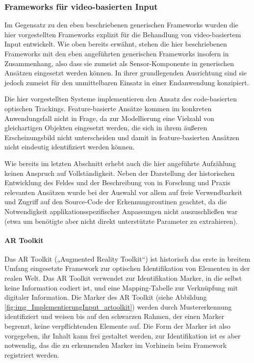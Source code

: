 
\subsubsection{Frameworks für video-basierten Input} %
\label{ssub:frameworks_für_video_basierten_input}

Im Gegensatz zu den eben beschriebenen generischen Frameworks wurden die hier vorgestellten Frameworks explizit für die Behandlung von video-basiertem Input entwickelt. Wie oben bereits erwähnt, stehen die hier beschriebenen Frameworks mit den eben angeführten generischen Frameworks insofern in Zusammenhang, also dass sie zumeist als Sensor-Komponente in generischen Ansätzen eingesetzt werden können. In ihrer grundlegenden Ausrichtung sind sie jedoch zumeist für den unmittelbaren Einsatz in einer Endanwendung konzipiert.

Die hier vorgestellten Systeme implementieren den Ansatz des code-basierten optischen Trackings. Feature-basierte Ansätze kommen im konkreten Anwendungsfall nicht in Frage, da zur Modellierung eine Vielzahl von gleichartigen Objekten eingesetzt werden, die sich in ihrem äußeren Erscheinungsbild nicht unterscheiden und damit in feature-basierten Ansätzen nicht eindeutig identifiziert werden können.

Wie bereits im letzten Abschnitt erhebt auch die hier angeführte Aufzählung keinen Anspruch auf Vollständigkeit. Neben der Darstellung der historischen Entwicklung des Feldes und der Beschreibung von in Forschung und Praxis relevanten Ansätzen wurde bei der Auswahl vor allem auf freie Verwendbarkeit und Zugriff auf den Source-Code der Erkennungsroutinen geachtet, da die Notwendigkeit applikationsspezifischer Anpassungen nicht auszuschließen war (etwa um benötigte aber nicht direkt unterstützte Parameter zu extrahieren).

\paragraph{AR Toolkit}\label{par:artoolkit}
Das AR Toolkit („Augmented Reality Toolkit“) \citep{Kato00} ist historisch das erste in breitem Umfang eingesetzte Framework zur optischen Identifikation von Elementen in der realen Welt. Das AR Toolkit verwendet zur Identifikation Marker, in die selbst keine Information codiert ist, und eine Mapping-Tabelle zur Verknüpfung mit digitaler Information. Die Marker des AR Toolkit (siehe Abbildung \ref{fig:img_ImplementierungInput_artoolkit}) werden durch Mustererkennung identifiziert und weisen bis auf den schwarzen Rahmen, der einen Marker begrenzt, keine verpflichtenden Elemente auf. Die Form der Marker ist also vorgegeben, ihr Inhalt kann frei gestaltet werden, zur Identifikation ist es aber notwendig, das die zu erkennenden Marker im Vorhinein beim Framework registriert werden. 


